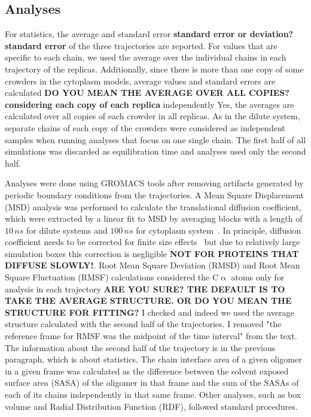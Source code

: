 \documentclass[journal=jcisd8,manuscript=article]{achemso}
\begin{document}
\subsection{Analyses}
For statistics, the average and standard error {\bf standard error or
  deviation? \color{blue} standard error} of the three trajectories are reported. For values that
are specific to each chain, we used the average over the individual
chains in each trajectory of the replicas. Additionally, since there
is more than one copy of some crowders in the cytoplasm models,
average values and standard errors are calculated {\bf DO YOU MEAN THE
  AVERAGE OVER ALL COPIES? considering each copy of each replica}
independently {\color{blue} Yes, the averages are calculated over all copies of each crowder in all replicas}. As in the dilute system, separate chains of each copy
of the crowders were considered as independent samples when running
analyses that focus on one single chain. The first half of all
simulations was discarded as equilibration time and analyses used only
the second half.

Analyses were done using GROMACS tools after removing artifacts
generated by periodic boundary conditions from the trajectories. A
Mean Square Displacement (MSD) analysis was performed to calculate the
translational diffusion coefficient, which were extracted by a linear
fit to MSD by averaging blocks with a length of $10\, ns$ for dilute systems and $100\, ns$ 
for cytoplasm system~\cite{Allen1987a}. In principle, diffusion
coefficient needs to be corrected for finite size
effects~\cite{Yeh2004} but due to relatively large simulation boxes
this correction is negligible {\bf NOT FOR PROTEINS THAT DIFFUSE
  SLOWLY!}. Root Mean Square Deviation (RMSD) and Root Mean Square
Fluctuation (RMSF) calculations considered the C$\upalpha$ atoms only for analysis in each trajectory
{\bf ARE YOU SURE? THE DEFAULT IS TO TAKE THE AVERAGE STRUCTURE. OR DO
  YOU MEAN THE STRUCTURE FOR FITTING?} {\color{blue} I checked and indeed we used the average structure calculated with the second half of the trajectories. I removed "the reference frame for RMSF was the midpoint of the time interval" from the text. The information about the second half of the trajectory is in the previous paragraph, which is about statistics}. The chain interface area of a given oligomer in a given
frame was calculated as the difference between the solvent exposed
surface area (SASA) of the oligomer in that frame and the sum of the
SASAs of each of its chains independently in that same frame. Other
analyses, such as box volume and Radial Distribution Function (RDF),
followed standard procedures.
\end{document}
